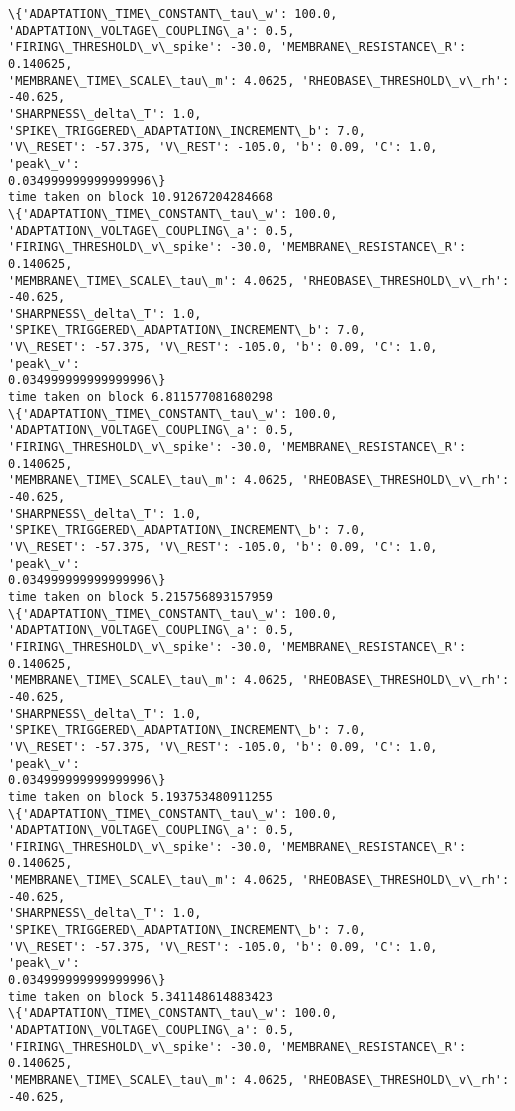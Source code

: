 \documentclass[11pt]{article}
\begin{document}
    \begin{Verbatim}[commandchars=\\\{\}]
\{'ADAPTATION\_TIME\_CONSTANT\_tau\_w': 100.0, 'ADAPTATION\_VOLTAGE\_COUPLING\_a': 0.5,
'FIRING\_THRESHOLD\_v\_spike': -30.0, 'MEMBRANE\_RESISTANCE\_R': 0.140625,
'MEMBRANE\_TIME\_SCALE\_tau\_m': 4.0625, 'RHEOBASE\_THRESHOLD\_v\_rh': -40.625,
'SHARPNESS\_delta\_T': 1.0, 'SPIKE\_TRIGGERED\_ADAPTATION\_INCREMENT\_b': 7.0,
'V\_RESET': -57.375, 'V\_REST': -105.0, 'b': 0.09, 'C': 1.0, 'peak\_v':
0.034999999999999996\}
time taken on block 10.91267204284668
\{'ADAPTATION\_TIME\_CONSTANT\_tau\_w': 100.0, 'ADAPTATION\_VOLTAGE\_COUPLING\_a': 0.5,
'FIRING\_THRESHOLD\_v\_spike': -30.0, 'MEMBRANE\_RESISTANCE\_R': 0.140625,
'MEMBRANE\_TIME\_SCALE\_tau\_m': 4.0625, 'RHEOBASE\_THRESHOLD\_v\_rh': -40.625,
'SHARPNESS\_delta\_T': 1.0, 'SPIKE\_TRIGGERED\_ADAPTATION\_INCREMENT\_b': 7.0,
'V\_RESET': -57.375, 'V\_REST': -105.0, 'b': 0.09, 'C': 1.0, 'peak\_v':
0.034999999999999996\}
time taken on block 6.811577081680298
\{'ADAPTATION\_TIME\_CONSTANT\_tau\_w': 100.0, 'ADAPTATION\_VOLTAGE\_COUPLING\_a': 0.5,
'FIRING\_THRESHOLD\_v\_spike': -30.0, 'MEMBRANE\_RESISTANCE\_R': 0.140625,
'MEMBRANE\_TIME\_SCALE\_tau\_m': 4.0625, 'RHEOBASE\_THRESHOLD\_v\_rh': -40.625,
'SHARPNESS\_delta\_T': 1.0, 'SPIKE\_TRIGGERED\_ADAPTATION\_INCREMENT\_b': 7.0,
'V\_RESET': -57.375, 'V\_REST': -105.0, 'b': 0.09, 'C': 1.0, 'peak\_v':
0.034999999999999996\}
time taken on block 5.215756893157959
\{'ADAPTATION\_TIME\_CONSTANT\_tau\_w': 100.0, 'ADAPTATION\_VOLTAGE\_COUPLING\_a': 0.5,
'FIRING\_THRESHOLD\_v\_spike': -30.0, 'MEMBRANE\_RESISTANCE\_R': 0.140625,
'MEMBRANE\_TIME\_SCALE\_tau\_m': 4.0625, 'RHEOBASE\_THRESHOLD\_v\_rh': -40.625,
'SHARPNESS\_delta\_T': 1.0, 'SPIKE\_TRIGGERED\_ADAPTATION\_INCREMENT\_b': 7.0,
'V\_RESET': -57.375, 'V\_REST': -105.0, 'b': 0.09, 'C': 1.0, 'peak\_v':
0.034999999999999996\}
time taken on block 5.193753480911255
\{'ADAPTATION\_TIME\_CONSTANT\_tau\_w': 100.0, 'ADAPTATION\_VOLTAGE\_COUPLING\_a': 0.5,
'FIRING\_THRESHOLD\_v\_spike': -30.0, 'MEMBRANE\_RESISTANCE\_R': 0.140625,
'MEMBRANE\_TIME\_SCALE\_tau\_m': 4.0625, 'RHEOBASE\_THRESHOLD\_v\_rh': -40.625,
'SHARPNESS\_delta\_T': 1.0, 'SPIKE\_TRIGGERED\_ADAPTATION\_INCREMENT\_b': 7.0,
'V\_RESET': -57.375, 'V\_REST': -105.0, 'b': 0.09, 'C': 1.0, 'peak\_v':
0.034999999999999996\}
time taken on block 5.341148614883423
\{'ADAPTATION\_TIME\_CONSTANT\_tau\_w': 100.0, 'ADAPTATION\_VOLTAGE\_COUPLING\_a': 0.5,
'FIRING\_THRESHOLD\_v\_spike': -30.0, 'MEMBRANE\_RESISTANCE\_R': 0.140625,
'MEMBRANE\_TIME\_SCALE\_tau\_m': 4.0625, 'RHEOBASE\_THRESHOLD\_v\_rh': -40.625,

\end{Verbatim}
\end{document}
